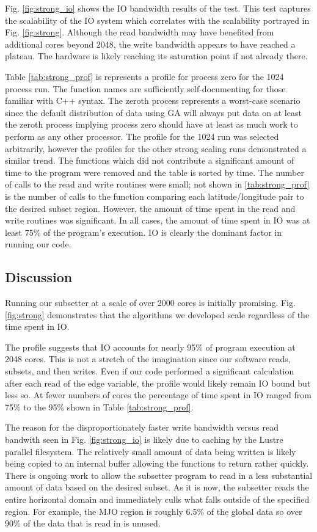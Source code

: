 Fig. \ref{fig:strong_io} shows the IO bandwidth results of the test.  This test
captures the scalability of the IO system which correlates with the scalability
portrayed in Fig. \ref{fig:strong}.  Although the read bandwidth may have
benefited from additional cores beyond 2048, the write bandwidth appears to
have reached a plateau.  The hardware is likely reaching its saturation point
if not already there.

Table \ref{tab:strong_prof} is represents a profile for process zero for the
1024 process run.  The function names are sufficiently self-documenting for
those familiar with C++ syntax.  The zeroth process represents a worst-case
scenario since the default distribution of data using GA will always put data
on at least the zeroth process implying process zero should have at least as
much work to perform as any other processor.  The profile for the 1024 run was
selected arbitrarily, however the profiles for the other strong scaling runs
demonstrated a similar trend.  The functions which did not contribute a
significant amount of time to the program were removed and the table is sorted
by time.  The number of calls to the read and write routines were small; not
shown in \ref{tab:strong_prof} is the number of calls to the function
comparing each latitude/longitude pair to the desired subset region.  However,
the amount of time spent in the read and write routines was significant.  In
all cases, the amount of time spent in IO was at least 75\% of the program's
execution.  IO is clearly the dominant factor in running our code.

\subsection{Discussion}

Running our subsetter at a scale of over 2000 cores is initially promising.
Fig. \ref{fig:strong} demonstrates that the algorithms we developed scale
regardless of the time spent in IO.

The profile suggests that IO accounts for nearly 95\% of program execution at
2048 cores.  This is not a stretch of the imagination since our software reads,
subsets, and then writes.  Even if our code performed a significant calculation
after each read of the edge variable, the profile would likely remain IO bound
but less so.  At fewer numbers of cores the percentage of time spent in IO
ranged from 75\% to the 95\% shown in Table \ref{tab:strong_prof}.

The reason for the disproportionately faster write bandwidth versus read
bandwith seen in Fig. \ref{fig:strong_io} is likely due to caching by the
Lustre parallel filesystem.  The relatively small amount of data being written
is likely being copied to an internal buffer allowing the functions to return
rather quickly.  There is ongoing work to allow the subsetter program to read
in a less substantial amount of data based on the desired subset.  As it is
now, the subsetter reads the entire horizontal domain and immediately culls
what falls outside of the specified region.  For example, the MJO region is
roughly 6.5\% of the global data so over 90\% of the data that is read in is
unused.
